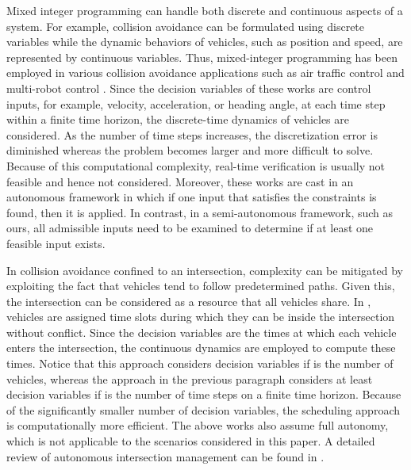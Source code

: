 \documentclass{sig-alternate}
\begin{document}
Mixed integer programming can handle both discrete and continuous aspects of a system. For example, collision avoidance can be formulated using discrete variables while the dynamic behaviors of vehicles, such as position and speed, are represented by continuous variables. Thus, mixed-integer programming has been employed in various collision avoidance applications such as air traffic control \cite{richards_spacecraft_2002,borrelli_milp_2006,christodoulou_automatic_2006} and multi-robot control \cite{earl_modeling_2002,grotli_path_2011}. Since the decision variables of these works are control inputs, for example, velocity, acceleration, or heading angle, at each time step within a finite time horizon, the discrete-time dynamics of vehicles are considered. As the number of time steps increases, the discretization error is diminished whereas the problem becomes larger and more difficult to solve. Because of this computational complexity, real-time verification is usually not feasible and hence not considered. Moreover, these works are cast in an autonomous framework in which if one input that satisfies the constraints is found, then it is applied. In contrast, in a semi-autonomous framework, such as ours, all admissible inputs need to be examined to determine if at least one feasible input exists.

In collision avoidance confined to an intersection, complexity can be mitigated by exploiting the fact that vehicles tend to follow predetermined paths. Given this, the intersection can be considered as a resource that all vehicles share. In \cite{kowshik_provable_2011, lee_development_2012,campos_cooperative_2014}, vehicles are assigned time slots during which they can be inside the intersection without conflict. Since the decision variables are the times at which each vehicle enters the intersection, the continuous dynamics are employed to compute these times. Notice that this approach considers  decision variables if  is the number of vehicles, whereas the approach in the previous paragraph considers at least  decision variables if  is the number of time steps on a finite time horizon. Because of the significantly smaller number of decision variables, the scheduling approach is computationally more efficient. The above works also assume full autonomy, which is not applicable to the scenarios considered in this paper. A detailed review of autonomous intersection management can be found in \cite{chen_cooperative_2015}.
\end{document}
